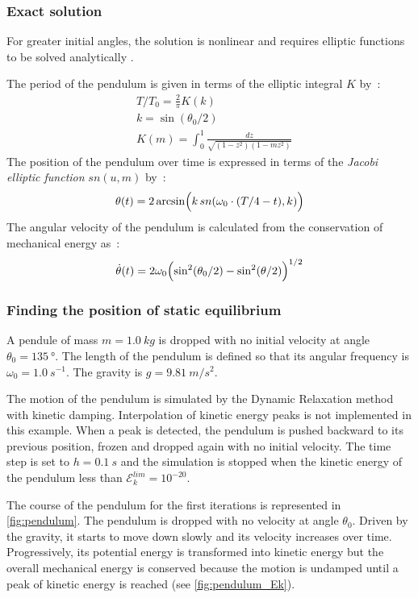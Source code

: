 \subsubsection{Exact solution}
For greater initial angles, the solution is nonlinear and requires elliptic functions to be solved analytically \cite{Borghi2013,Belendez2007}.

The period of the pendulum is given in terms of the elliptic integral $K$ by~:
\begin{subequations}
\begin{alignat}{5}	
	&T / T_0  = \frac{2}{\pi}K(k)
	\\[0.5em]
	& k = \sin (\theta_0 / 2)
	\\[0.5em]
	&K(m) = \int_0^1 \frac{dz}{\sqrt{(1-z^2)(1-mz^2)}}
\end{alignat}
\end{subequations}
The position of the pendulum over time is expressed in terms of the \emph{Jacobi elliptic function} $sn(u,m)$ by~:
\begin{equation}
	\theta(t) = 2 \arcsin \Bigl( k \,sn(\omega_0\cdot(T/4 - t), k) \Bigr)
\end{equation}
The angular velocity of the pendulum is calculated from the conservation of mechanical energy as~:
\begin{equation}
	\dot{\theta}(t) = 2 \omega_0 \Bigl( \sin^2 (\theta_0/2) - \sin^2 (\theta/2) \Bigr)^{1/2}
\end{equation}

\subsubsection{Finding the position of static equilibrium}
A pendule of mass $m = \SI{1.0}{kg}$ is dropped with no initial velocity at angle $\theta_0 = \SI{135}{\degree}$. The length of the pendulum is defined so that its angular frequency is $\omega_0 = \SI{1.0}{s^{-1}}$. The gravity is $g = \SI{9.81}{m/s^2}$. 

The motion of the pendulum is simulated by the Dynamic Relaxation method with kinetic damping. Interpolation of kinetic energy peaks is not implemented in this example. When a peak is detected, the pendulum is pushed backward to its previous position, frozen and dropped again with no initial velocity. The time step is set to $h = \SI{0.1}{s}$ and the simulation is stopped when the kinetic energy of the pendulum less than $\mathcal{E}_k^{lim} = 10^{-20}$. 

The course of the pendulum for the first iterations is represented in \cref{fig:pendulum}. The pendulum is dropped with no velocity at angle $\theta_0$. Driven by the gravity, it starts to move down slowly and its velocity increases over time. Progressively, its potential energy is transformed into kinetic energy but the overall mechanical energy is conserved because the motion is undamped until a peak of kinetic energy is reached (see \cref{fig:pendulum_Ek}).

